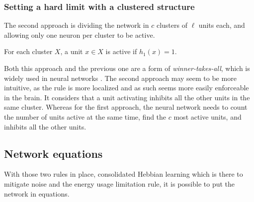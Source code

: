 \documentclass[journal]{IEEEtran}
\begin{document}
\subsubsection{Setting a hard limit with a clustered structure}

The second approach is dividing the network in $c$ clusters of $\ell$ units each, and allowing only one neuron per cluster to be active.

For each cluster $X$, a unit $x \in X$ is active if $h_1(x) = 1$.

\medskip


Both this approach and the previous one are a form of \emph{winner-takes-all}, which is widely used in neural networks \cite{wolpert1992stacked,dlugosz2010realization}. The second approach may seem to be more intuitive, as the rule is more localized and as such seems more easily enforceable in the brain. It considers that a unit activating inhibits all the other units in the same cluster. Whereas for the first approach, the neural network needs to count the number of units active at the same time, find the $c$ most active units, and inhibits all the other units.




\subsection{Network equations}

With those two rules in place, consolidated Hebbian learning which is there to mitigate noise and the energy usage limitation rule, it is possible to put the network in equations.
\end{document}
